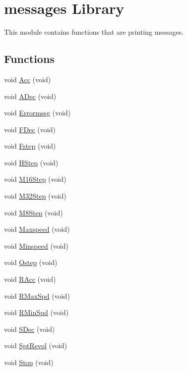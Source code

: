\hypertarget{group__biba__messges}{\section{messages Library}
\label{group__biba__messges}
}


This module contains functions that are printing messages.  


\subsection*{Functions}
\begin{DoxyCompactItemize}
\item 
void \hyperlink{group__biba__messges_ga6e96dc2b209da9d4eef98fb809f1f615}{Acc} (void)
\item 
void \hyperlink{group__biba__messges_ga4df90f192fc647ecf71806dc05b290b5}{A\-Dec} (void)
\item 
void \hyperlink{group__biba__messges_gaa77012dc6d2b6aba302311b04e512abc}{Errormssg} (void)
\item 
void \hyperlink{group__biba__messges_ga0dd076c947adc7f37ed9024c16def436}{F\-Dec} (void)
\item 
void \hyperlink{group__biba__messges_ga6a0297ad8db89b689f7314473dd7cd7a}{Fstep} (void)
\item 
void \hyperlink{group__biba__messges_ga53669298f54817f8d2b140050dc910f1}{H\-Step} (void)
\item 
void \hyperlink{group__biba__messges_ga286e4f6b6038548b06d71fb6badfd28b}{M16\-Step} (void)
\item 
void \hyperlink{group__biba__messges_ga5b419cf59d479fba5c67c575b553e158}{M32\-Step} (void)
\item 
void \hyperlink{group__biba__messges_ga40b8844aa998b3549f6194d437100ee7}{M8\-Step} (void)
\item 
void \hyperlink{group__biba__messges_gaa5f13f30a59a97aca9198b06a0c90112}{Maxspeed} (void)
\item 
void \hyperlink{group__biba__messges_ga46822b53dd41e304ef1887ef7075ffd7}{Minspeed} (void)
\item 
void \hyperlink{group__biba__messges_ga11901ed666ca738e518ff569cf8d947a}{Qstep} (void)
\item 
void \hyperlink{group__biba__messges_gad576f94f72a14d6cf14d7a3217d3fdb5}{R\-Acc} (void)
\item 
void \hyperlink{group__biba__messges_ga1cee417b557775a8a769eb5bc2306f08}{R\-Max\-Spd} (void)
\item 
void \hyperlink{group__biba__messges_gaabc2b68cf794e6851e1826ba9e083c3b}{R\-Min\-Spd} (void)
\item 
void \hyperlink{group__biba__messges_gad5028f9e871f7e63759218b94a829f45}{S\-Dec} (void)
\item 
void \hyperlink{group__biba__messges_ga98ca8e64d40da656ab802f68b0eb84a1}{Spt\-Revol} (void)
\item 
void \hyperlink{group__biba__messges_ga76c658dc5f4332e4b034419dca518c1c}{Stop} (void)
\end{DoxyCompactItemize}


